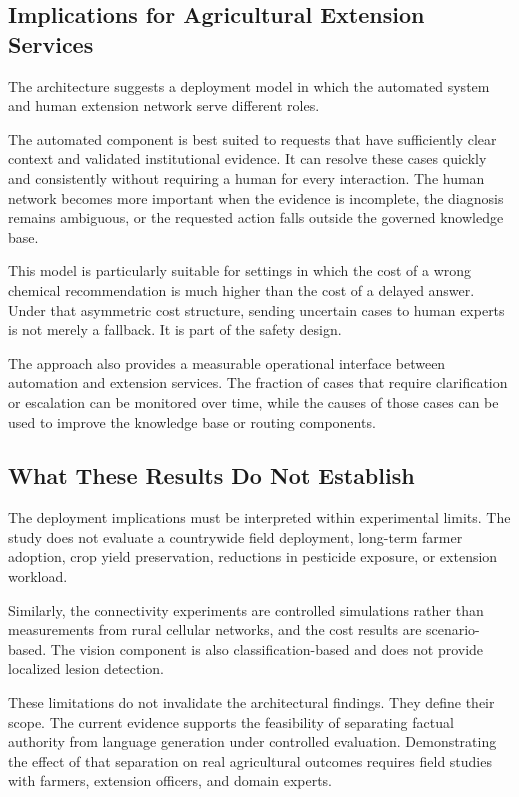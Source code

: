 \documentclass[a4paper,fleqn]{cas-dc}
\begin{document}
\subsection{Implications for Agricultural Extension Services}

The architecture suggests a deployment model in which the automated system and human extension network serve different roles.

The automated component is best suited to requests that have sufficiently clear context and validated institutional evidence. It can resolve these cases quickly and consistently without requiring a human for every interaction. The human network becomes more important when the evidence is incomplete, the diagnosis remains ambiguous, or the requested action falls outside the governed knowledge base.

This model is particularly suitable for settings in which the cost of a wrong chemical recommendation is much higher than the cost of a delayed answer. Under that asymmetric cost structure, sending uncertain cases to human experts is not merely a fallback. It is part of the safety design.

The approach also provides a measurable operational interface between automation and extension services. The fraction of cases that require clarification or escalation can be monitored over time, while the causes of those cases can be used to improve the knowledge base or routing components.

\subsection{What These Results Do Not Establish}

The deployment implications must be interpreted within experimental limits. The study does not evaluate a countrywide field deployment, long-term farmer adoption, crop yield preservation, reductions in pesticide exposure, or extension workload.

Similarly, the connectivity experiments are controlled simulations rather than measurements from rural cellular networks, and the cost results are scenario-based. The vision component is also classification-based and does not provide localized lesion detection. 

These limitations do not invalidate the architectural findings. They define their scope. The current evidence supports the feasibility of separating factual authority from language generation under controlled evaluation. Demonstrating the effect of that separation on real agricultural outcomes requires field studies with farmers, extension officers, and domain experts.
\end{document}

